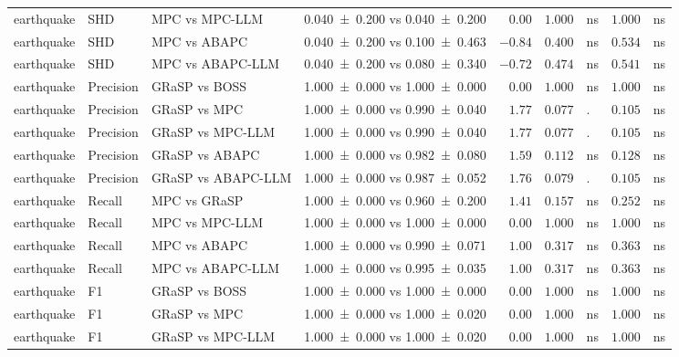 \begin{table}[t]
{\begin{tabular}{ll l|c|r|rl|rl}
    earthquake & SHD & MPC vs MPC-LLM & \num{0.040 +- 0.200} vs \num{0.040 +- 0.200} & $0.00$ & $1.000$ & \!\!\!ns & $1.000$ & \!\!\!ns \\
    earthquake & SHD & MPC vs ABAPC & \num{0.040 +- 0.200} vs \num{0.100 +- 0.463} & $-0.84$ & $0.400$ & \!\!\!ns & $0.534$ & \!\!\!ns \\
    earthquake & SHD & MPC vs ABAPC-LLM & \num{0.040 +- 0.200} vs \num{0.080 +- 0.340} & $-0.72$ & $0.474$ & \!\!\!ns & $0.541$ & \!\!\!ns \\
    earthquake & Precision & GRaSP vs BOSS & \num{1.000 +- 0.000} vs \num{1.000 +- 0.000} & $0.00$ & $1.000$ & \!\!\!ns & $1.000$ & \!\!\!ns \\
    earthquake & Precision & GRaSP vs MPC & \num{1.000 +- 0.000} vs \num{0.990 +- 0.040} & $1.77$ & $0.077$ & \!\!\!. & $0.105$ & \!\!\!ns \\
    earthquake & Precision & GRaSP vs MPC-LLM & \num{1.000 +- 0.000} vs \num{0.990 +- 0.040} & $1.77$ & $0.077$ & \!\!\!. & $0.105$ & \!\!\!ns \\
    earthquake & Precision & GRaSP vs ABAPC & \num{1.000 +- 0.000} vs \num{0.982 +- 0.080} & $1.59$ & $0.112$ & \!\!\!ns & $0.128$ & \!\!\!ns \\
    earthquake & Precision & GRaSP vs ABAPC-LLM & \num{1.000 +- 0.000} vs \num{0.987 +- 0.052} & $1.76$ & $0.079$ & \!\!\!. & $0.105$ & \!\!\!ns \\
    earthquake & Recall & MPC vs GRaSP & \num{1.000 +- 0.000} vs \num{0.960 +- 0.200} & $1.41$ & $0.157$ & \!\!\!ns & $0.252$ & \!\!\!ns \\
    earthquake & Recall & MPC vs MPC-LLM & \num{1.000 +- 0.000} vs \num{1.000 +- 0.000} & $0.00$ & $1.000$ & \!\!\!ns & $1.000$ & \!\!\!ns \\
    earthquake & Recall & MPC vs ABAPC & \num{1.000 +- 0.000} vs \num{0.990 +- 0.071} & $1.00$ & $0.317$ & \!\!\!ns & $0.363$ & \!\!\!ns \\
    earthquake & Recall & MPC vs ABAPC-LLM & \num{1.000 +- 0.000} vs \num{0.995 +- 0.035} & $1.00$ & $0.317$ & \!\!\!ns & $0.363$ & \!\!\!ns \\
    earthquake & F1 & GRaSP vs BOSS & \num{1.000 +- 0.000} vs \num{1.000 +- 0.000} & $0.00$ & $1.000$ & \!\!\!ns & $1.000$ & \!\!\!ns \\
    earthquake & F1 & GRaSP vs MPC & \num{1.000 +- 0.000} vs \num{1.000 +- 0.020} & $0.00$ & $1.000$ & \!\!\!ns & $1.000$ & \!\!\!ns \\
    earthquake & F1 & GRaSP vs MPC-LLM & \num{1.000 +- 0.000} vs \num{1.000 +- 0.020} & $0.00$ & $1.000$ & \!\!\!ns & $1.000$ & \!\!\!ns \\

\end{tabular}}
\end{table}
